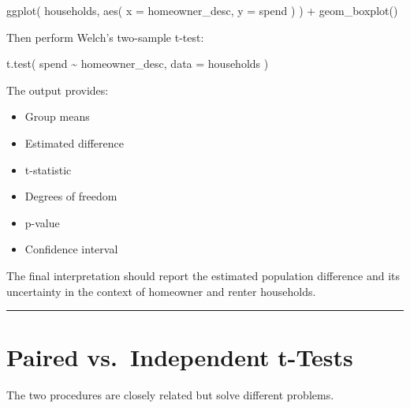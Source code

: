 \documentclass[
  letterpaper,
  DIV=11,
  numbers=noendperiod]{scrreprt}
\newenvironment{Shaded}{\begin{snugshade}}{\end{snugshade}}
\newcommand{\AttributeTok}[1]{\textcolor[rgb]{0.40,0.45,0.13}{#1}}
\newcommand{\FunctionTok}[1]{\textcolor[rgb]{0.28,0.35,0.67}{#1}}
\newcommand{\NormalTok}[1]{\textcolor[rgb]{0.00,0.23,0.31}{#1}}
\newcommand{\SpecialCharTok}[1]{\textcolor[rgb]{0.37,0.37,0.37}{#1}}
\providecommand{\tightlist}{%
  \setlength{\itemsep}{0pt}\setlength{\parskip}{0pt}}
\begin{document}
\begin{Shaded}
\begin{Highlighting}[]
\FunctionTok{ggplot}\NormalTok{(}
\NormalTok{    households,}
    \FunctionTok{aes}\NormalTok{(}
        \AttributeTok{x =}\NormalTok{ homeowner\_desc,}
        \AttributeTok{y =}\NormalTok{ spend}
\NormalTok{    )}
\NormalTok{) }\SpecialCharTok{+}
    \FunctionTok{geom\_boxplot}\NormalTok{()}
\end{Highlighting}
\end{Shaded}

Then perform Welch's two-sample t-test:

\begin{Shaded}
\begin{Highlighting}[]
\FunctionTok{t.test}\NormalTok{(}
\NormalTok{    spend }\SpecialCharTok{\textasciitilde{}}\NormalTok{ homeowner\_desc,}
    \AttributeTok{data =}\NormalTok{ households}
\NormalTok{)}
\end{Highlighting}
\end{Shaded}

The output provides:

\begin{itemize}
\tightlist
\item
  Group means
\item
  Estimated difference
\item
  t-statistic
\item
  Degrees of freedom
\item
  p-value
\item
  Confidence interval
\end{itemize}

The final interpretation should report the estimated population
difference and its uncertainty in the context of homeowner and renter
households.

\begin{center}\rule{0.5\linewidth}{0.5pt}\end{center}


\chapter{Paired vs.~Independent
t-Tests}\label{paired-vs.-independent-t-tests}

The two procedures are closely related but solve different problems.
\end{document}
